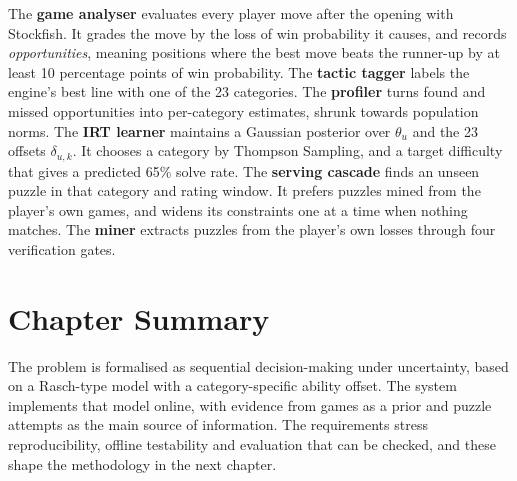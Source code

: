 The \textbf{game analyser} evaluates every player move after the opening with Stockfish. It grades
the move by the loss of win probability it causes, and records \emph{opportunities}, meaning
positions where the best move beats the runner-up by at least 10 percentage points of win
probability. The \textbf{tactic tagger} labels the engine's best line with one of the 23 categories.
The \textbf{profiler} turns found and missed opportunities into per-category estimates, shrunk
towards population norms. The \textbf{IRT learner} maintains a Gaussian posterior over $\theta_u$ and
the 23 offsets $\delta_{u,k}$. It chooses a category by Thompson Sampling, and a target difficulty
that gives a predicted 65\% solve rate. The \textbf{serving cascade} finds an unseen puzzle in that
category and rating window. It prefers puzzles mined from the player's own games, and widens its
constraints one at a time when nothing matches. The \textbf{miner} extracts puzzles from the player's
own losses through four verification gates.

\section{Chapter Summary}

The problem is formalised as sequential decision-making under uncertainty, based on a Rasch-type
model with a category-specific ability offset. The system implements that model online, with
evidence from games as a prior and puzzle attempts as the main source of information. The
requirements stress reproducibility, offline testability and evaluation that can be checked, and
these shape the methodology in the next chapter.
